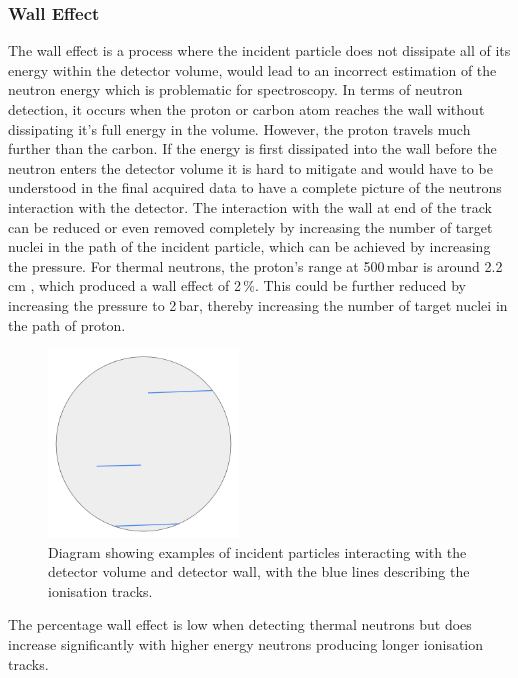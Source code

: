 \documentclass[a4paper]{article}
\begin{document}
\subsubsection{Wall Effect} \label{wall}
The wall effect is a process where the incident particle does not dissipate all of its energy within the detector volume, would lead to an incorrect estimation of the neutron energy which is problematic for spectroscopy. In terms of neutron detection, it occurs when the proton or carbon atom reaches the wall without dissipating it's full energy in the volume. However, the proton travels much further than the carbon. If the energy is first dissipated into the wall before the neutron enters the detector volume it is hard to mitigate and would have to be understood in the final acquired data to have a complete picture of the neutrons interaction with the detector.
The interaction with the wall at end of the track can be reduced or even removed completely by increasing the number of target nuclei in the path of the incident particle, which can be achieved by increasing the pressure. For thermal neutrons, the proton's range at 500\,mbar is around 2.2\,cm \cite{katsioulas_2016}, which produced a wall effect of 2\,\%. This could be further reduced by increasing the pressure to 2\,bar, thereby increasing the number of target nuclei in the path of proton. 
\begin{figure}[H]
    \centering
    \includegraphics[height=5cm]{walll.png}
    \caption{Diagram showing examples of incident particles interacting with the detector volume and detector wall, with the blue lines describing the ionisation tracks.}
    \label{fig:wall}
\end{figure}
\noindent The percentage wall effect is low when detecting thermal neutrons but does increase significantly with higher energy neutrons producing longer ionisation tracks. 
\end{document}
